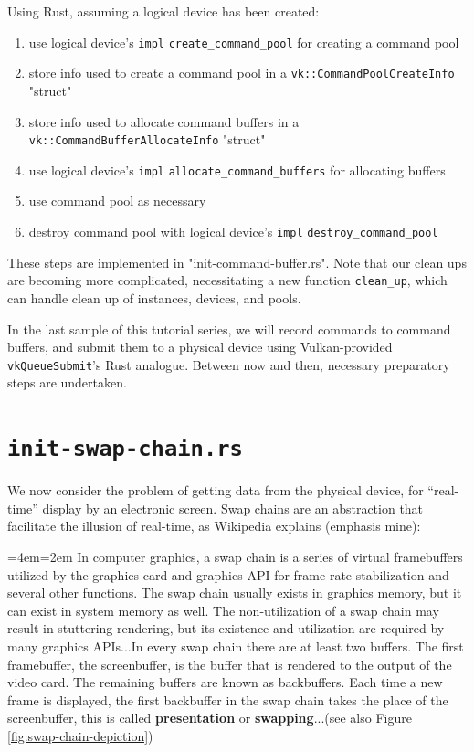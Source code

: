 \documentclass[12pt,letterpaper]{article}
\newcommand{\inquotes}[1]{``#1''}	%
\newcommand{\ril}[1]{\texttt{#1}}
\newcommand{\cil}[1]{\texttt{#1}}
\newenvironment{indenttext}{%
	\par%
	\medskip
	\leftskip=4em\rightskip=2em%
	\noindent\ignorespaces}{%
	\par\medskip}
\renewenvironment{quotation}{\begin{indenttext}\fontfamily{LinuxLibertineT-OsF}\selectfont}{\end{indenttext}}
\begin{document}
	Using Rust, assuming a logical device has been created:
		\begin{enumerate}
            \item use logical device's \ril{impl} \ril{create_command_pool} for creating a command pool
            
			\item store info used to create a command pool in a \ril{vk::CommandPoolCreateInfo} "struct"
			
			\item store info used to allocate command buffers in a \ril{vk::CommandBufferAllocateInfo} "struct"
			
			\item use logical device's \ril{impl} \ril{allocate_command_buffers} for allocating buffers
			
			\item use command pool as necessary
			
			\item destroy command pool with logical device's \ril{impl} \ril{destroy_command_pool}
		\end{enumerate}
    
	These steps are implemented in "init-command-buffer.rs". Note that our clean ups are becoming more complicated, necessitating a new function \ril{clean_up}, which can handle clean up of instances, devices, and pools. 
	
	In the last sample of this tutorial series, we will record commands to command buffers, and submit them to a physical device using Vulkan-provided \cil{vkQueueSubmit}'s Rust analogue. Between now and then, necessary preparatory steps are undertaken.
	
\section{\texttt{init-swap-chain.rs}}
	We now consider the problem of getting data from the physical device, for \inquotes{real-time} display by an electronic screen. Swap chains are an abstraction that facilitate the illusion of real-time, as Wikipedia explains\autocite{wiki:swap-chain} (emphasis mine):
		\begin{quotation}
			In computer graphics, a swap chain is a series of virtual framebuffers utilized by the graphics card and graphics API for frame rate stabilization and several other functions. The swap chain usually exists in graphics memory, but it can exist in system memory as well. The non-utilization of a swap chain may result in stuttering rendering, but its existence and utilization are required by many graphics APIs...In every swap chain there are at least two buffers. The first framebuffer, the screenbuffer, is the buffer that is rendered to the output of the video card. The remaining buffers are known as backbuffers. Each time a new frame is displayed, the first backbuffer in the swap chain takes the place of the screenbuffer, this is called \textbf{presentation} or \textbf{swapping}...(see also Figure \ref{fig:swap-chain-depiction})
		\end{quotation}
	
\end{document}

